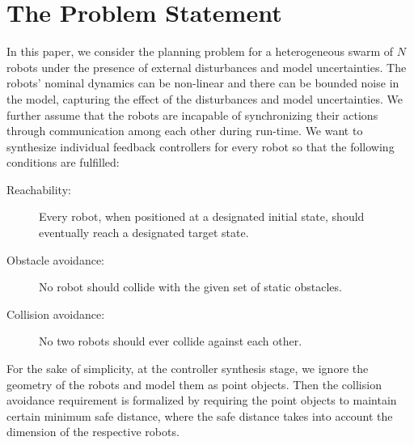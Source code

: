 
\section{The Problem Statement}
In this paper, we consider the planning problem for a heterogeneous swarm of $N$ robots under the presence of external disturbances and model uncertainties. 
The robots' nominal dynamics can be non-linear and there can be bounded noise in the model, capturing the effect of the disturbances and model uncertainties.
We further assume that the robots are incapable of synchronizing their actions through communication among each other during run-time.
We want to synthesize individual feedback controllers for every robot so that the following conditions are fulfilled:
\begin{description}
	\item[Reachability:] Every robot, when positioned at a designated initial state, should eventually reach a designated target state.
	\item[Obstacle avoidance:] No robot should collide with the given set of static obstacles.
	\item[Collision avoidance:] No two robots should ever collide against each other.
\end{description}
For the sake of simplicity, at the controller synthesis stage, we ignore the geometry of the robots and model them as point objects.
Then the collision avoidance requirement is formalized by requiring the point objects to maintain certain minimum safe distance, where the safe distance takes into account the dimension of the respective robots.

